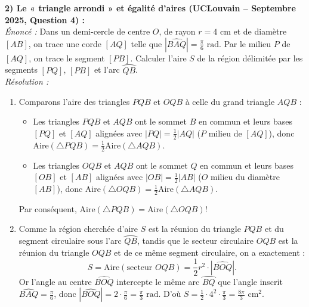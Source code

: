 \begin{exemple}
\medskip
\textbf{2) Le « triangle arrondi » et égalité d'aires (UCLouvain -- Septembre 2025, Question 4) :}\\
\emph{Énoncé :} Dans un demi-cercle de centre $O$, de rayon $r = 4\text{ cm}$ et de diamètre $[AB]$, on trace une corde $[AQ]$ telle que $|\widehat{BAQ}| = \frac{\pi}{6}\text{ rad}$. Par le milieu $P$ de $[AQ]$, on trace le segment $[PB]$. Calculer l'aire $S$ de la région délimitée par les segments $[PQ]$, $[PB]$ et l'arc $\wideparen{QB}$.\\
\emph{Résolution :}
\begin{enumerate}
    \item Comparons l'aire des triangles $PQB$ et $OQB$ à celle du grand triangle $AQB$ :
    \begin{itemize}
        \item Les triangles $PQB$ et $AQB$ ont le sommet $B$ en commun et leurs bases $[PQ]$ et $[AQ]$ alignées avec $|PQ| = \frac{1}{2}|AQ|$ ($P$ milieu de $[AQ]$), donc $\text{Aire}(\triangle PQB) = \frac{1}{2}\text{Aire}(\triangle AQB)$.
        \item Les triangles $OQB$ et $AQB$ ont le sommet $Q$ en commun et leurs bases $[OB]$ et $[AB]$ alignées avec $|OB| = \frac{1}{2}|AB|$ ($O$ milieu du diamètre $[AB]$), donc $\text{Aire}(\triangle OQB) = \frac{1}{2}\text{Aire}(\triangle AQB)$.
    \end{itemize}
    Par conséquent, $\text{Aire}(\triangle PQB) = \text{Aire}(\triangle OQB)$!
    \item Comme la région cherchée d'aire $S$ est la réunion du triangle $PQB$ et du segment circulaire sous l'arc $\wideparen{QB}$, tandis que le secteur circulaire $OQB$ est la réunion du triangle $OQB$ et de ce même segment circulaire, on a exactement :
    \[
        S = \text{Aire}(\text{secteur } OQB) = \frac{1}{2}r^2 \cdot |\widehat{BOQ}|.
    \]
    Or l'angle au centre $\widehat{BOQ}$ intercepte le même arc $\wideparen{BQ}$ que l'angle inscrit $\widehat{BAQ} = \frac{\pi}{6}$, donc $|\widehat{BOQ}| = 2 \cdot \frac{\pi}{6} = \frac{\pi}{3}\text{ rad}$. D'où $S = \frac{1}{2} \cdot 4^2 \cdot \frac{\pi}{3} = \boxed{\frac{8\pi}{3}\text{ cm}^2}$.
\end{enumerate}


\end{exemple}
